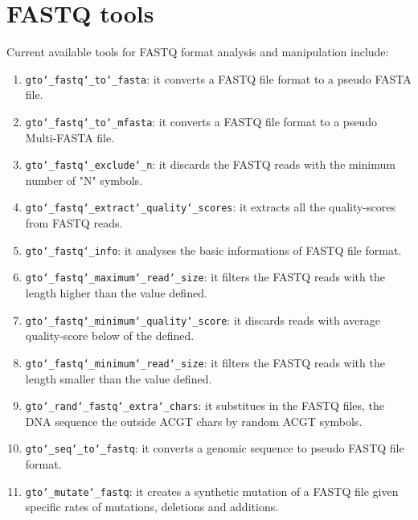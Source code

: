\chapter{FASTQ tools}
\label{fastq}

Current available tools for FASTQ format analysis and manipulation include:
\begin{enumerate}

\item \texttt{gto\char`_fastq\char`_to\char`_fasta}: it converts a FASTQ file format to a pseudo FASTA file.
\item \texttt{gto\char`_fastq\char`_to\char`_mfasta}: it converts a FASTQ file format to a pseudo Multi-FASTA file.

\item \texttt{gto\char`_fastq\char`_exclude\char`_n}: it discards the FASTQ reads with the minimum number of "N" symbols.
\item \texttt{gto\char`_fastq\char`_extract\char`_quality\char`_scores}: it extracts all the quality-scores from FASTQ reads.
\item \texttt{gto\char`_fastq\char`_info}: it analyses the basic informations of FASTQ file format.
\item \texttt{gto\char`_fastq\char`_maximum\char`_read\char`_size}: it filters the FASTQ reads with the length higher than the value defined.

\item \texttt{gto\char`_fastq\char`_minimum\char`_quality\char`_score}: it discards reads with average quality-score below of the defined.
\item \texttt{gto\char`_fastq\char`_minimum\char`_read\char`_size}: it filters the FASTQ reads with the length smaller than the value defined.

\item \texttt{gto\char`_rand\char`_fastq\char`_extra\char`_chars}: it substitues in the FASTQ files, the DNA sequence the outside ACGT chars by random ACGT symbols.

\item \texttt{gto\char`_seq\char`_to\char`_fastq}: it converts a genomic sequence to pseudo FASTQ file format.

\item \texttt{gto\char`_mutate\char`_fastq}: it creates a synthetic mutation of a FASTQ file given specific rates of mutations, deletions and additions.

\end{enumerate}



















